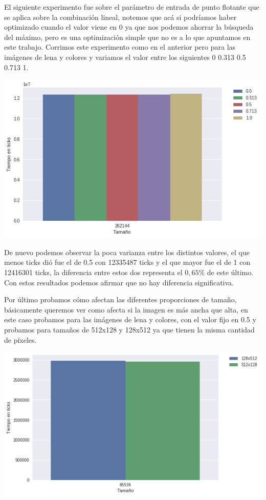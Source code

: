 El siguiente experimento fue sobre el parámetro de entrada de punto flotante que se aplica sobre la combinación lineal, notemos que acá si podríamos haber optimizado cuando el valor viene en 0 ya que nos podemos ahorrar la búsqueda del máximo, pero es una optimización simple que no es a lo que apuntamos en este trabajo. Corrimos este experimento como en el anterior pero para las imágenes de lena y colores y variamos el valor entre los siguientes 0 0.313 0.5 0.713 1.

\begin{center} 
	\includegraphics[scale=0.5]{img/maxCloser_PARAM_VAL.png}
\end{center}

De nuevo podemos observar la poca varianza entre los distintos valores, el que menos ticks dió fue el de 0.5 con 12335487 ticks y el que mayor fue el de 1 con 12416301 ticks, la diferencia entre estos dos representa el $0,65\%$ de este último. Con estos resultados podemos afirmar que no hay diferencia significativa.

Por último probamos cómo afectan las diferentes proporciones de tamaño, básicamente queremos ver como afecta si la imagen es más ancha que alta, en este caso probamos para las imágenes de lena y colores,  con el valor fijo en 0.5 y probamos para tamaños de 512x128 y 128x512 ya que tienen la misma cantidad de píxeles.

\begin{center} 
	\includegraphics[scale=0.5]{img/maxCloser_PARAM_SIZE.png}
\end{center}

